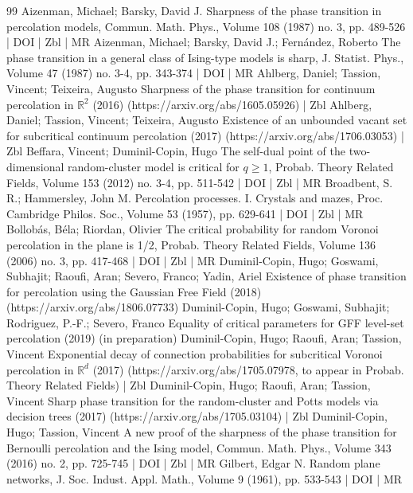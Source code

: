\documentclass[10pt]{amsart}
\theoremstyle{definition}\newtheorem{defi}[theo]{Definition}\newtheorem{rema}[theo]{Remark}\newtheorem{exam}[theo]{Example}\newtheorem{exem}[theo]{Example}\newtheorem{nota}[theo]{Notation}
\begin{document}
\begin{thebibliography}{99}
Aizenman, Michael; Barsky, David J. Sharpness of the phase transition in percolation models, Commun. Math. Phys., Volume 108 (1987) no. 3, pp. 489-526 | DOI | Zbl | MR
Aizenman, Michael; Barsky, David J.; Fernández, Roberto The phase transition in a general class of Ising-type models is sharp, J. Statist. Phys., Volume 47 (1987) no. 3-4, pp. 343-374 | DOI | MR
Ahlberg, Daniel; Tassion, Vincent; Teixeira, Augusto Sharpness of the phase transition for continuum percolation in $\mathbb{R}^2$ (2016) (https://arxiv.org/abs/1605.05926) | Zbl
Ahlberg, Daniel; Tassion, Vincent; Teixeira, Augusto Existence of an unbounded vacant set for subcritical continuum percolation (2017) (https://arxiv.org/abs/1706.03053) | Zbl
Beffara, Vincent; Duminil-Copin, Hugo The self-dual point of the two-dimensional random-cluster model is critical for $q\ge 1$, Probab. Theory Related Fields, Volume 153 (2012) no. 3-4, pp. 511-542 | DOI | Zbl | MR
Broadbent, S. R.; Hammersley, John M. Percolation processes. I. Crystals and mazes, Proc. Cambridge Philos. Soc., Volume 53 (1957), pp. 629-641 | DOI | Zbl | MR
Bollobás, Béla; Riordan, Olivier The critical probability for random Voronoi percolation in the plane is 1/2, Probab. Theory Related Fields, Volume 136 (2006) no. 3, pp. 417-468 | DOI | Zbl | MR
Duminil-Copin, Hugo; Goswami, Subhajit; Raoufi, Aran; Severo, Franco; Yadin, Ariel Existence of phase transition for percolation using the Gaussian Free Field (2018) (https://arxiv.org/abs/1806.07733)
Duminil-Copin, Hugo; Goswami, Subhajit; Rodriguez, P.-F.; Severo, Franco Equality of critical parameters for GFF level-set percolation (2019) (in preparation)
Duminil-Copin, Hugo; Raoufi, Aran; Tassion, Vincent Exponential decay of connection probabilities for subcritical Voronoi percolation in $\mathbb{R}^d$ (2017) (https://arxiv.org/abs/1705.07978, to appear in Probab. Theory Related Fields) | Zbl
Duminil-Copin, Hugo; Raoufi, Aran; Tassion, Vincent Sharp phase transition for the random-cluster and Potts models via decision trees (2017) (https://arxiv.org/abs/1705.03104) | Zbl
Duminil-Copin, Hugo; Tassion, Vincent A new proof of the sharpness of the phase transition for Bernoulli percolation and the Ising model, Commun. Math. Phys., Volume 343 (2016) no. 2, pp. 725-745 | DOI | Zbl | MR
Gilbert, Edgar N. Random plane networks, J. Soc. Indust. Appl. Math., Volume 9 (1961), pp. 533-543 | DOI | MR

\end{thebibliography}
\end{document}
